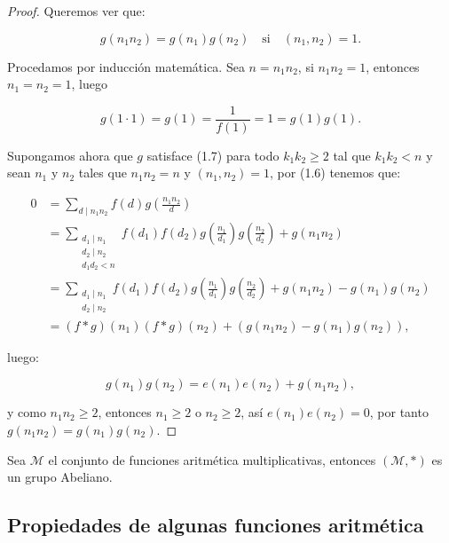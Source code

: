 \begin{proof}
Queremos ver que:

\begin{equation}
g(n_1n_2)=g(n_1)g(n_2) \quad \text{si} \quad (n_1,n_2)=1.
\end{equation}

Procedamos por inducción matemática. Sea $n=n_1 n_2$, si $n_1 n_2=1$, entonces $n_1=n_2=1$, luego

$$g(1\cdot 1)=g(1)=\dfrac{1}{f(1)}=1=g(1)g(1).$$

Supongamos ahora que $g$ satisface (1.7) para todo $k_1k_2\geq 2$ tal que $k_1k_2<n$ y sean $n_1$ y $n_2$ tales que $n_1n_2=n$ y $(n_1,n_2)=1$, por (1.6) tenemos que:

$$
\begin{aligned}
0 & =\sum_{d \mid n_1 n_2} f(d) g\left(\frac{n_1n_2}{d}\right) \\
&=\sum_{\substack{d_1 \mid n_1 \\
d_2\mid n_2\\ d_1d_2<n}} f(d_1)f(d_2) g \left( \frac{n_1}{d_1} \right)g \left( \frac{n_2}{d_2} \right)+ g(n_1n_2)\\
&=\sum_{\substack{d_1 \mid n_1 \\
d_2\mid n_2}} f(d_1)f(d_2) g \left( \frac{n_1}{d_1} \right)g \left( \frac{n_2}{d_2} \right)+ g(n_1n_2)-g(n_1)g(n_2)\\
& =(f * g)\left(n_1\right)(f * g)\left(n_2\right)+\left(g\left(n_1 n_2\right)-g\left(n_1\right) g\left(n_2\right)\right),
\end{aligned}
$$

luego:

$$g\left(n_1\right) g\left(n_2\right)=e\left(n_1\right) e\left(n_2\right)+g\left(n_1 n_2\right),$$

\vspace*{0.2cm}

y como $n_1n_2\geq 2$, entonces $n_1\geq 2$ o $n_2\geq 2$, así $e(n_1)e(n_2)=0$, por tanto $g(n_1n_2)=g(n_1)g(n_2)$.
\end{proof}

\begin{corollary}
Sea $\mathcal{M}$ el conjunto de funciones aritmética multiplicativas, entonces $(\mathcal{M},*)$ es un grupo Abeliano.
\end{corollary}

\subsection{Propiedades de algunas funciones aritmética}


